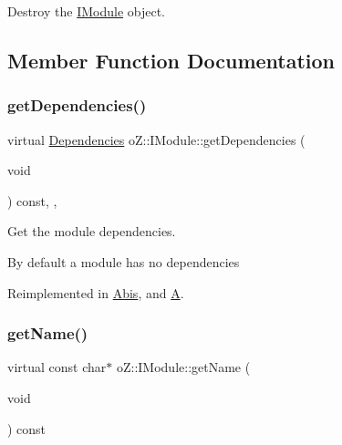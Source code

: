 Destroy the \mbox{\hyperlink{classo_z_1_1_i_module}{I\+Module}} object. 



\subsection{Member Function Documentation}
\mbox{\label{classo_z_1_1_i_module_a720a329e6ebcbecbc150d8b0bbee6e37}} 
\subsubsection{\texorpdfstring{getDependencies()}{getDependencies()}}
{\footnotesize\ttfamily virtual \mbox{\hyperlink{classo_z_1_1_i_module_ac13210556cb2a65d186bfbe5208c666c}{Dependencies}} o\+Z\+::\+I\+Module\+::get\+Dependencies (\begin{DoxyParamCaption}\item[{void}]{ }\end{DoxyParamCaption}) const\hspace{0.3cm}{\ttfamily [inline]}, {\ttfamily [virtual]}, {\ttfamily [noexcept]}}



Get the module dependencies. 

By default a module has no dependencies 

Reimplemented in \mbox{\hyperlink{class_abis_a20476073293d54658c3891decbb4a725}{Abis}}, and \mbox{\hyperlink{class_a_a2220cafae67f880a553d6219dfcf8581}{A}}.

\mbox{\label{classo_z_1_1_i_module_af41d45158fd28e1bd86a34e25f5282d6}} 
\subsubsection{\texorpdfstring{getName()}{getName()}}
{\footnotesize\ttfamily virtual const char$\ast$ o\+Z\+::\+I\+Module\+::get\+Name (\begin{DoxyParamCaption}\item[{void}]{ }\end{DoxyParamCaption}) const\hspace{0.3cm}{\ttfamily [pure virtual]}}



